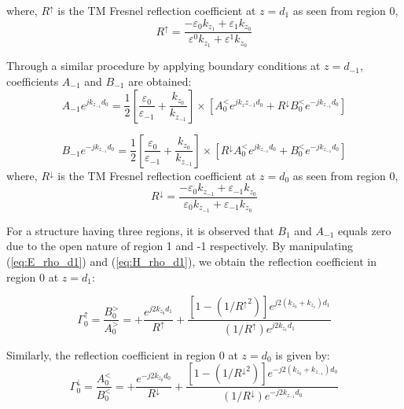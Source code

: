 \documentclass{article}
\begin{document}
  where, $R^{\uparrow}$ is the TM Fresnel reflection coefficient at $ z=d_1$ as seen from region 0,
  \begin{equation}
    R^{\uparrow} = \frac{-\varepsilon_0 k_{z_1} + \varepsilon_1 k_{z_0}}{\varepsilon^0 k_{z_1} + \varepsilon^1 k_{z_0}}
    \label{eq:R_up}
  \end{equation}

  Through a similar procedure by applying boundary conditions at $z=d_{-1}$, coefficients $A_{-1}$ and $B_{-1}$ are obtained:
  \begin{equation}
    A_{-1} e^{jk_{z_{-1}} d_{0}} = \frac{1}{2} \left[ \frac{\varepsilon_0}{\varepsilon_{-1}} + \frac{k_{z_0}}{k_{z_{-1}}} \right] \times \left[  A_0^< e^{jk_z{z_{-1}} d_0} + R^{\downarrow} B_0^< e^{-jk_{z_{-1}} d_0} \right]
    \label{eq:A_-1}
  \end{equation}

  \begin{equation}
    B_{-1} e^{-jk_{z_{-1}} d_0} = \frac{1}{2} \left[ \frac{\varepsilon_0}{\varepsilon_{-1}} + \frac{k_{z_0}}{k_{z_{-1}}} \right] \times \left[R^{\downarrow}  A_0^< e^{jk_{z_{-1}} d_0} + B_0^< e^{-jk_{z_{-1}} d_0} \right]
    \label{eq:B_-1}
  \end{equation}
  where, $R^{\downarrow}$ is the TM Fresnel reflection coefficient at $ z=d_0$ as seen from region 0,
  \begin{equation}
    R^{\downarrow} = \frac{-\varepsilon_0 k_{z_{-1}} + \varepsilon_{-1} k_{z_0}}{\varepsilon_0 k_{z_{-1}} + \varepsilon_{-1} k_{z_0}}
    \label{eq:R_up}
  \end{equation}

  For a structure having three regions, it is observed that $B_1$ and $A_{-1}$ equals zero due to the open nature of region 1 and -1 respectively. By manipulating (\ref{eq:E_rho_d1}) and (\ref{eq:H_rho_d1}), we obtain the reflection coefficient in region 0 at $z=d_1$:

  \begin{equation}
    \Gamma_0^{\uparrow} = \frac{B_0^>}{A_0^>} = +\frac{e^{j2k_{z_0} d_1}}{R^{\uparrow}} + \frac{ \left[ 1 - (1/{R^{\uparrow}}^2) \right]e^{j2(k_{z_0} + k_{z_1}) d_1}}{(1/R^{\uparrow})e^{j2k_{z_1} d_1}}
    \label{eq:gamma_up}
  \end{equation}

  Similarly, the reflection coefficient in region 0 at $z=d_0$ is given by:
  \begin{equation}
    \Gamma_0^{\downarrow} = \frac{A_0^<}{B_0^<} = +\frac{e^{-j2k_{z_0} d_0}}{R^{\downarrow}} + \frac{ \left[ 1 - (1/{R^{\downarrow}}^2) \right]e^{-j2(k_{z_0} + k_{z_{-1}}) d_0}}{(1/R^{\downarrow})e^{-j2k_{z_{-1}} d_0}}
    \label{eq:gamma_down}
  \end{equation}
\end{document}
